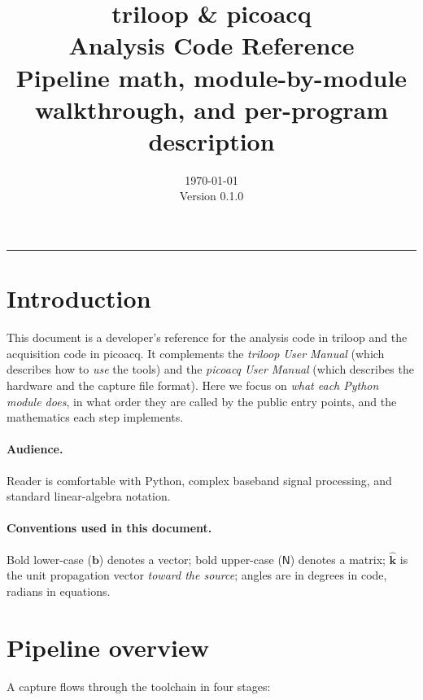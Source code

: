 \documentclass[11pt]{article}
\title{\Large\bfseries triloop \& picoacq\\[2pt]
       \large Analysis Code Reference\\[8pt]
       \normalsize Pipeline math, module-by-module walkthrough, and
       per-program description}
\author{}
\date{\today \\[6pt] \small Version 0.1.0}
\begin{document}
\maketitle

\tableofcontents
\bigskip\hrule\bigskip

\section{Introduction}

This document is a developer's reference for the analysis code in
\textsf{triloop} and the acquisition code in \textsf{picoacq}.  It
complements the \textit{triloop User Manual} (which describes how to
\emph{use} the tools) and the \textit{picoacq User Manual} (which
describes the hardware and the capture file format).  Here we focus on
\emph{what each Python module does}, in what order they are called by
the public entry points, and the mathematics each step implements.

\paragraph{Audience.} Reader is comfortable with Python, complex
baseband signal processing, and standard linear-algebra notation.

\paragraph{Conventions used in this document.} Bold lower-case
($\mathbf b$) denotes a vector; bold upper-case ($\mathsf{N}$) denotes
a matrix; $\hat{\mathbf k}$ is the unit propagation vector \emph{toward
the source}; angles are in degrees in code, radians in equations.

\section{Pipeline overview}

A capture flows through the toolchain in four stages:
\end{document}
